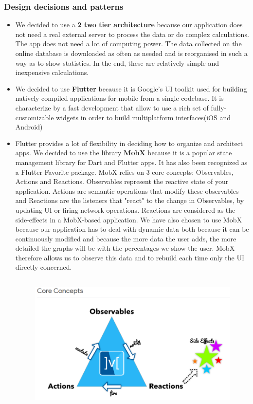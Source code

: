 \documentclass [12pt]{article}
\begin{document}
\subsubsection{Design decisions and patterns}
\begin{itemize}
\item We decided to use a \textbf{2 two tier architecture} because our application does not need a real external server to process the data or do complex calculations. The app does not need a lot of computing power. The data collected on the online database is downloaded as often as needed and is reorganised in such a way as to show statistics. In the end, these are relatively simple and inexpensive calculations.
\item We decided to use \textbf{Flutter} because it is Google’s UI toolkit used for building natively compiled applications for mobile from a single codebase. It is characterize by a fast development that allow to
use a rich set of fully-customizable widgets in order to build multiplatform interfaces(iOS and Android)
\item Flutter provides a lot of flexibility in deciding how to organize and architect apps. We decided to use the library \textbf{MobX} because it is a popular state management library for Dart and Flutter apps. It has also been recognized as a Flutter Favorite package.
MobX relies on 3 core concepts: Observables, Actions and Reactions. Observables represent the reactive state of your application. Actions are semantic operations that modify these observables and Reactions are the listeners that "react" to the change in Observables, by updating UI or firing network operations. Reactions are considered as the side-effects in a MobX-based application. We have also chosen to use MobX because our application has to deal with dynamic data both because it can be continuously modified and because the more data the user adds, the more detailed the graphs will be with the percentages we show the user. MobX therefore allows us to observe this data and to rebuild each time only the UI directly concerned.
\begin{figure}[ht!]
\centering
\includegraphics[height=7cm, width=12cm]{MobX.png}

\end{figure}
\end{itemize}
\end{document}
